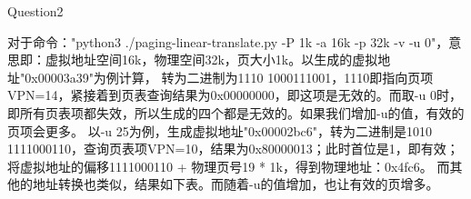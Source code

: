 \documentclass[12pt]{article}
\begin{document}
\begin{large}
	\noindent Question2\\
\end{large}
\hspace*{2em}对于命令："python3 ./paging-linear-translate.py -P 1k -a 16k -p 32k -v -u 0"，意思即：虚拟地址空间16k，物理空间32k，页大小1k。以生成的虚拟地址"0x00003a39"为例计算，
转为二进制为1110 1000111001，1110即指向页项VPN=14，紧接着到页表查询结果为0x00000000，即这项是无效的。而取-u 0时，即所有页表项都失效，所以生成的四个都是无效的。如果我们增加-u的值，有效的页项会更多。
以-u 25为例，生成虚拟地址"0x00002bc6"，转为二进制是1010 1111000110，查询页表项VPN=10，结果为0x80000013；此时首位是1，即有效；将虚拟地址的偏移1111000110 + 物理页号19 * 1k，得到物理地址：0x4fc6。
而其他的地址转换也类似，结果如下表。而随着-u的值增加，也让有效的页增多。\\
\end{document}
